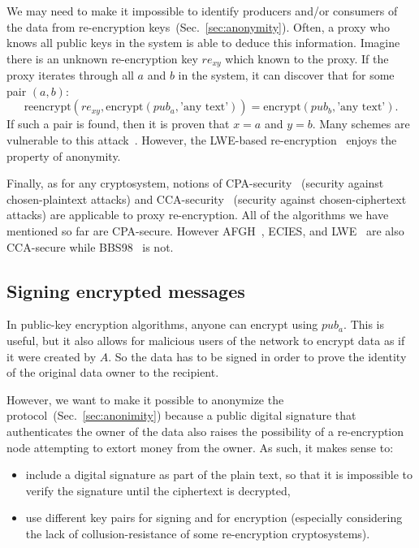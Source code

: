 \documentclass[longbibliography,nofootinbib]{revtex4-1}
\begin{document}
We may need to make it impossible to identify producers and/or consumers of the data from re-encryption keys~(Sec.~\ref{sec:anonymity}).
Often, a proxy who knows all public keys in the system is able to deduce this information.
Imagine there is an unknown re-encryption key $re_{xy}$ which known to the proxy.
If the proxy iterates through all $a$ and $b$ in the system, it can discover that for some pair $(a, b)$:
$$\text{reencrypt}(re_{xy}, \text{encrypt}(pub_a, \text{'any text'})) = \text{encrypt}(pub_b, \text{'any text'}).$$
If such a pair is found, then it is proven that $x=a$ and $y=b$.
Many schemes are vulnerable to this attack~\cite{BBS98,AFGH}.
However, the LWE-based re-encryption~\cite{lwe-reencryption} enjoys the property of anonymity.

Finally, as for any cryptosystem, notions of CPA-security~\cite{wiki:cpa} (security against chosen-plaintext attacks)
and CCA-security~\cite{wiki:cca} (security against chosen-ciphertext attacks) are applicable to proxy re-encryption.
All of the algorithms we have mentioned so far are CPA-secure.
However AFGH~\cite{AFGH}, ECIES, and LWE~\cite{lwe-reencryption} are also CCA-secure while BBS98~\cite{BBS98} is not.

\subsection{Signing encrypted messages}

In public-key encryption algorithms, anyone can encrypt using $pub_a$.
This is useful, but it also allows for malicious users of the network to encrypt data as if it were created by $A$.
So the data has to be signed in order to prove the identity of the original data owner to the recipient.

However, we want to make it possible to anonymize the protocol~(Sec.~\ref{sec:anonimity}) because
a public digital signature that authenticates the owner of the data also raises the possibility of a re-encryption node attempting to extort money from the owner.
As such, it makes sense to:
\begin{itemize}
    \item include a digital signature as part of the plain text, so that it is impossible to verify the signature until the ciphertext is decrypted,
    \item use different key pairs for signing and for encryption (especially considering the lack of collusion-resistance of some re-encryption
        cryptosystems).
\end{itemize}
\end{document}
